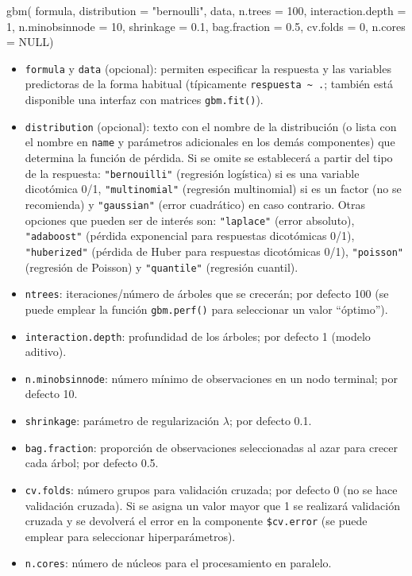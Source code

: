 \documentclass[
  spanish,
]{book}
\newenvironment{Shaded}{\begin{snugshade}}{\end{snugshade}}
\newcommand{\AttributeTok}[1]{\textcolor[rgb]{0.77,0.63,0.00}{#1}}
\newcommand{\ConstantTok}[1]{\textcolor[rgb]{0.00,0.00,0.00}{#1}}
\newcommand{\DecValTok}[1]{\textcolor[rgb]{0.00,0.00,0.81}{#1}}
\newcommand{\FloatTok}[1]{\textcolor[rgb]{0.00,0.00,0.81}{#1}}
\newcommand{\FunctionTok}[1]{\textcolor[rgb]{0.00,0.00,0.00}{#1}}
\newcommand{\NormalTok}[1]{#1}
\newcommand{\StringTok}[1]{\textcolor[rgb]{0.31,0.60,0.02}{#1}}
\theoremstyle{break}
\theoremstyle{definition}
\theoremstyle{definition}
\theoremstyle{definition}
\theoremstyle{definition}
\theoremstyle{remark}
\begin{document}
\begin{Shaded}
\begin{Highlighting}[]
\FunctionTok{gbm}\NormalTok{( formula, }\AttributeTok{distribution =} \StringTok{"bernoulli"}\NormalTok{, data, }\AttributeTok{n.trees =} \DecValTok{100}\NormalTok{, }
     \AttributeTok{interaction.depth =} \DecValTok{1}\NormalTok{, }\AttributeTok{n.minobsinnode =} \DecValTok{10}\NormalTok{,}
     \AttributeTok{shrinkage =} \FloatTok{0.1}\NormalTok{, }\AttributeTok{bag.fraction =} \FloatTok{0.5}\NormalTok{, }
     \AttributeTok{cv.folds =} \DecValTok{0}\NormalTok{, }\AttributeTok{n.cores =} \ConstantTok{NULL}\NormalTok{)}
\end{Highlighting}
\end{Shaded}

\begin{itemize}
\item
  \texttt{formula} y \texttt{data} (opcional): permiten especificar la respuesta y las variables predictoras de la forma habitual (típicamente \texttt{respuesta\ \textasciitilde{}\ .}; también está disponible una interfaz con matrices \texttt{gbm.fit()}).
\item
  \texttt{distribution} (opcional): texto con el nombre de la distribución (o lista con el nombre en \texttt{name} y parámetros adicionales en los demás componentes) que determina la función de pérdida.
  Si se omite se establecerá a partir del tipo de la respuesta: \texttt{"bernouilli"} (regresión logística) si es una variable dicotómica 0/1, \texttt{"multinomial"} (regresión multinomial) si es un factor (no se recomienda) y \texttt{"gaussian"} (error cuadrático) en caso contrario.
  Otras opciones que pueden ser de interés son: \texttt{"laplace"} (error absoluto), \texttt{"adaboost"} (pérdida exponencial para respuestas dicotómicas 0/1), \texttt{"huberized"} (pérdida de Huber para respuestas dicotómicas 0/1), \texttt{"poisson"} (regresión de Poisson) y \texttt{"quantile"} (regresión cuantil).
\item
  \texttt{ntrees}: iteraciones/número de árboles que se crecerán; por defecto 100 (se puede emplear la función \texttt{gbm.perf()} para seleccionar un valor ``óptimo'').
\item
  \texttt{interaction.depth}: profundidad de los árboles; por defecto 1 (modelo aditivo).
\item
  \texttt{n.minobsinnode}: número mínimo de observaciones en un nodo terminal; por defecto 10.
\item
  \texttt{shrinkage}: parámetro de regularización \(\lambda\); por defecto 0.1.
\item
  \texttt{bag.fraction}: proporción de observaciones seleccionadas al azar para crecer cada árbol; por defecto 0.5.
\item
  \texttt{cv.folds}: número grupos para validación cruzada; por defecto 0 (no se hace validación cruzada). Si se asigna un valor mayor que 1 se realizará validación cruzada y se devolverá el error en la componente \texttt{\$cv.error} (se puede emplear para seleccionar hiperparámetros).
\item
  \texttt{n.cores}: número de núcleos para el procesamiento en paralelo.
\end{itemize}
\end{document}
